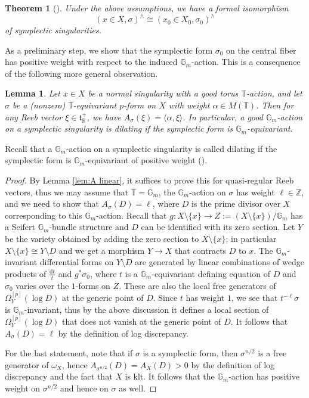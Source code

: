 \documentclass[12pt]{amsart}
\newtheorem{thm}[prop]{Theorem}
\newtheorem{lem}[prop]{Lemma}
\theoremstyle{definition}
\newcommand{\bR}{\mathbb{R}}
\newcommand{\bZ}{\mathbb{Z}}
\newcommand{\bT}{\mathbb{T}}
\newcommand{\bG}{\mathbb{G}}
\newcommand{\ft}{\mathfrak{t}}
\newcommand{\rd}{\mathrm{d}}
\numberwithin{equation}{section}
\begin{document}
\begin{thm}[\cite{NO-symp}] \label{thm:symplectic rigid}
Under the above assumptions, we have a formal isomorphism 
\[
(x\in X,\sigma)^{\wedge}\cong (x_0\in X_0,\sigma_0)^{\wedge}
\]
of symplectic singularities.
\end{thm}


As a preliminary step, we show that the symplectic form $\sigma_0$ on the central fiber has positive weight with respect to the induced $\bG_m$-action. This is a consequence of the following more general observation.

\begin{lem} \label{lem:wt=log discrep}
Let $x\in X$ be a normal singularity with a good torus $\bT$-action, and let $\sigma$ be a (nonzero) $\bT$-equivariant $p$-form on $X$ with weight $\alpha\in M(\bT)$. Then for any Reeb vector $\xi\in \ft_\bR^+$, we have $A_\sigma(\xi) = \langle\alpha,\xi\rangle$. In particular, a good $\bG_m$-action on a symplectic singularity is dilating if the symplectic form is $\bG_m$-equivariant.
\end{lem}

Recall that a $\bG_m$-action on a symplectic singularity is called dilating if the symplectic form is $\bG_m$-equivariant of positive weight (\cite[Definition 1.7]{Kaledin-survey}).

\begin{proof}
By Lemma \ref{lem:A linear}, it suffices to prove this for quasi-regular Reeb vectors, thus we may assume that $\bT=\bG_m$, the $\bG_m$-action on $\sigma$ has weight $\ell\in\bZ$, and we need to show that $A_\sigma (D) = \ell$, where $D$ is the prime divisor over $X$ corresponding to this $\bG_m$-action.  Recall that $g\colon X\setminus \{x\}\to Z:=(X\setminus \{x\})/\bG_m$ has a Seifert $\bG_m$-bundle structure and $D$ can be identified with its zero section. Let $Y$ be the variety obtained by adding the zero section to $X\setminus \{x\}$; in particular $X\setminus\{x\} \cong Y\setminus D$ and we get a morphism $Y\to X$ that contracts $D$ to $x$. The $\bG_m$-invariant differential forms on $Y\setminus D$ are generated by linear combinations of wedge products of $\frac{\rd t}{t}$ and $g^*\sigma_0$, where $t$ is a $\bG_m$-equivariant defining equation of $D$ and $\sigma_0$ varies over the $1$-forms on $Z$. These are also the local free generators of $\Omega_Y^{[p]}(\log D)$ at the generic point of $D$. Since $t$ has weight $1$, we see that $t^{-\ell}\sigma$ is $\bG_m$-invariant, thus by the above discussion it defines a local section of $\Omega_Y^{[p]}(\log D)$ that does not vanish at the generic point of $D$. It follows that $A_\sigma(D)=\ell$ by the definition of log discrepancy. 

For the last statement, note that if $\sigma$ is a symplectic form, then $\sigma^{n/2}$ is a free generator of $\omega_X$, hence $A_{\sigma^{n/2}}(D)=A_X(D)>0$ by the definition of log discrepancy and the fact that $X$ is klt. It follows that the $\bG_m$-action has positive weight on $\sigma^{n/2}$ and hence on $\sigma$ as well.
\end{proof}
\end{document}
